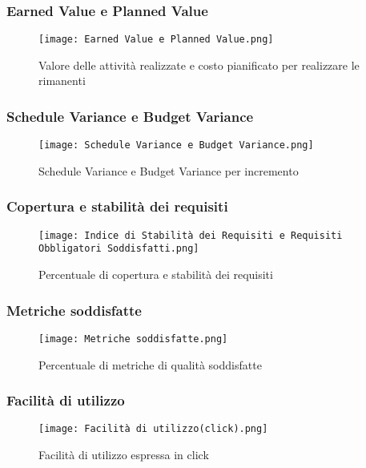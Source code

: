     \subsubsection{Earned Value e Planned Value}
    \begin{figure}[H]
      \centering
      \texttt{[image: Earned Value e Planned Value.png]}
      \caption{Valore delle attività realizzate e costo pianificato per realizzare le rimanenti}
    \end{figure}

    \subsubsection{Schedule Variance e Budget Variance}
    \begin{figure}[H]
      \centering
      \texttt{[image: Schedule Variance e Budget Variance.png]}
      \caption{Schedule Variance e Budget Variance per incremento}
    \end{figure}

    \subsubsection{Copertura e stabilità dei requisiti}
    \begin{figure}[H]
      \centering
      \texttt{[image: Indice di Stabilità dei Requisiti e Requisiti Obbligatori Soddisfatti.png]}
      \caption{Percentuale di copertura e stabilità dei requisiti}
    \end{figure}

    \subsubsection{Metriche soddisfatte}
    \begin{figure}[H]
      \centering
      \texttt{[image: Metriche soddisfatte.png]}
      \caption{Percentuale di metriche di qualità soddisfatte}
    \end{figure}

    \subsubsection{Facilità di utilizzo}
    \begin{figure}[H]
      \centering
      \texttt{[image: Facilità di utilizzo(click).png]}
      \caption{Facilità di utilizzo espressa in click}
    \end{figure}

